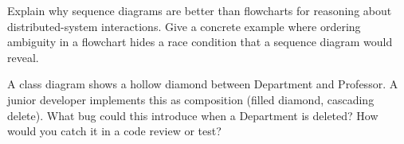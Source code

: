 \begin{exercise}
Explain why sequence diagrams are better than flowcharts for reasoning about distributed-system interactions. Give a concrete example where ordering ambiguity in a flowchart hides a race condition that a sequence diagram would reveal.
\end{exercise}

\begin{exercise}
A class diagram shows a hollow diamond between Department and Professor. A junior developer implements this as composition (filled diamond, cascading delete). What bug could this introduce when a Department is deleted? How would you catch it in a code review or test?
\end{exercise}

